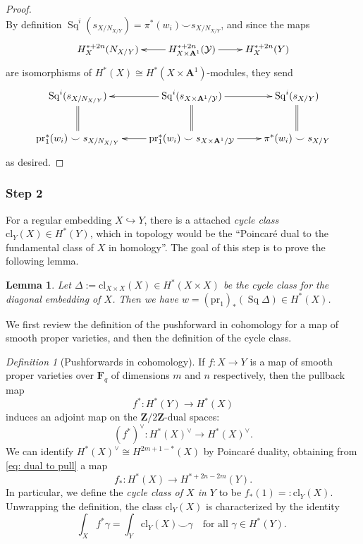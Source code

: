 \documentclass[10pt, reqno]{amsart}
\numberwithin{equation}{subsection}
\newcommand{\F}{\mathbf{F}}
\newcommand{\Z}{\mathbf{Z}}
\newcommand{\Cal}[1]{\mathcal{#1}}
\newcommand{\A}{\mathbf{A}}
\newcommand{\mrm}[1]{\mathrm{#1}}
\newcommand{\co}{\colon}
\DeclareMathOperator{\et}{\acute{e}t}
\DeclareMathOperator{\Sq}{Sq}
\newtheorem{lemma}[thm]{Lemma}
\theoremstyle{remark}
\newtheorem{defn}[thm]{Definition}
\begin{document}
\begin{proof}
\[{}
\]
By definition $\Sq^i (s_{X/N_{X/Y}}) = \pi^*(w_i) \smile s_{X/N_{X/Y}}$, and since the maps 
\[
\xymatrix{
H^{*+2n}_X ( N_{X/Y}) & \ar[l]  H^{*+2n}_{X\times \A^1}(\Cal{Y})  \ar[r] & H^{*+2n}_X(Y) 
}
\]
are isomorphisms of $H^*_{\et}(X) \cong H^*_{\et}(X \times \A^1)$-modules, they send 
\[
\xymatrix{
\Sq^i (s_{X/N_{X/Y}})  \ar@{=}[d] & \ar[l]  \Sq^i(s_{X \times \A^1/\Cal{Y}})  \ar[r]  \ar@{=}[d]  & \Sq^i(s_{X/Y})  \ar@{=}[d] \\
\mrm{pr}_1^*(w_i) \smile s_{X/N_{X/Y}} & \ar[l] \mrm{pr}_1^*(w_i) \smile s_{X \times \A^1/\Cal{Y}}  \ar[r] & \pi^*(w_i) \smile s_{X/Y}
}
\]
as desired. 
\end{proof}

\subsubsection{Step 2}\label{step2} For a regular embedding $X \hookrightarrow Y$, there is a attached \emph{cycle class} $\mrm{cl}_Y(X) \in H^*(Y)$, which in topology would be the ``Poincar\'{e} dual to the fundamental class of $X$ in homology''. The goal of this step is to prove the following lemma.

\begin{lemma}\label{lem: step 2} Let $\Delta := \mrm{cl}_{X \times X} (X) \in H^*_{\et}(X \times X)$ be the cycle class for the diagonal embedding of $X$. Then we have $w = (\mrm{pr}_1)_* (\Sq \Delta) \in H^*_{\et}(X)$.
\end{lemma}

 We first review the definition of the pushforward in cohomology for a map of smooth proper varieties, and then the definition of the cycle class. 
 
\begin{defn}[Pushforwards in cohomology]\label{defn: pushforward variety} If $f \colon X \rightarrow Y$ is a map of smooth proper varieties over $\F_q$ of dimensions $m$ and $n$ respectively, then the pullback map 
\[
f^* \colon H^*_{\et}(Y) \rightarrow H^*_{\et}(X)
\]
induces an adjoint map on the $\Z/2\Z$-dual spaces:
\begin{equation}\label{eq: dual to pull}
(f^*)^{\vee} \co  H^*_{\et}(X)^{\vee} \rightarrow H^*_{\et}(X)^{\vee}.
\end{equation}
We can identify $H^{*}_{\et}(X)^{\vee} \cong H^{2m+1-*}_{\et}(X)$ by Poincar\'{e} duality, obtaining from \eqref{eq: dual to pull} a map 
\[
f_* \colon H^*_{\et}(X) \rightarrow H^{*+2n-2m}_{\et}(Y).
\] 
In particular, we define the \emph{cycle class of $X$ in $Y$} to be $f_*(1) =: \mrm{cl}_Y(X)$. Unwrapping the definition, the class $\mrm{cl}_Y(X)$ is characterized by the identity
\[
\int_X f^* \gamma = \int_Y \mrm{cl}_Y(X) \smile \gamma \quad \text{
for all $\gamma \in H^*(Y)$. }
\]
\end{defn}
\end{document}
